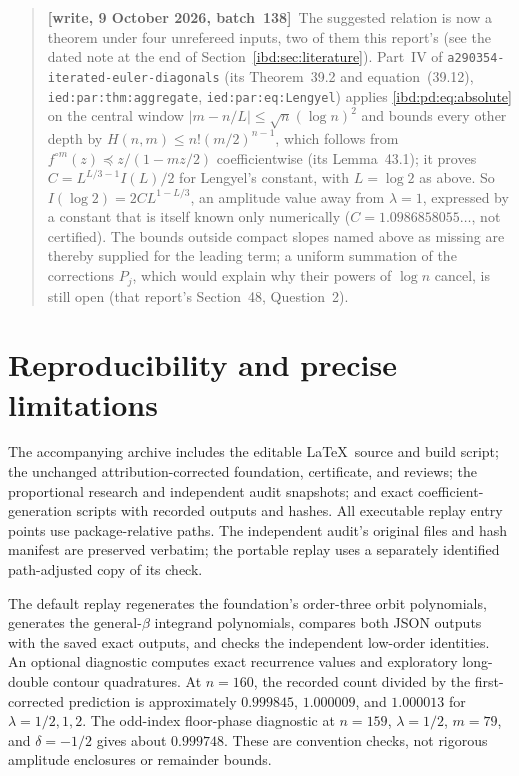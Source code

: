 \documentclass[11pt,letterpaper]{article}
\theoremstyle{remark}\newtheorem{remark}[theorem]{Remark}
\newcommand{\repopath}[1]{\nolinkurl{#1}}
\begin{document}
\par\smallskip\begin{quote}\small\textbf{[write, 9 October 2026, batch~138]}\ The suggested relation is now a theorem under four unrefereed inputs, two of them this report's (see the dated note at the end of Section~\ref{ibd:sec:literature}). Part~IV of \repopath{a290354-iterated-euler-diagonals} (its Theorem~39.2 and equation~(39.12), \texttt{ied:par:thm:aggregate}, \texttt{ied:par:eq:Lengyel}) applies \eqref{ibd:pd:eq:absolute} on the central window $|m-n/L|\le\sqrt n(\log n)^2$ and bounds every other depth by $H(n,m)\le n!(m/2)^{n-1}$, which follows from $f^{\circ m}(z)\preceq z/(1-mz/2)$ coefficientwise (its Lemma~43.1); it proves $C=L^{L/3-1}I(L)/2$ for Lengyel's constant, with $L=\log2$ as above. So $I(\log2)=2CL^{1-L/3}$, an amplitude value away from $\lambda=1$, expressed by a constant that is itself known only numerically ($C=1.0986858055\ldots$, not certified). The bounds outside compact slopes named above as missing are thereby supplied for the leading term; a uniform summation of the corrections $P_j$, which would explain why their powers of $\log n$ cancel, is still open (that report's Section~48, Question~2).\end{quote}\smallskip

\section{Reproducibility and precise limitations}\label{ibd:pd:sec:repro}
The accompanying archive includes the editable \LaTeX\ source and build script; the unchanged attribution-corrected foundation, certificate, and reviews; the proportional research and independent audit snapshots; and exact coefficient-generation scripts with recorded outputs and hashes. All executable replay entry points use package-relative paths. The independent audit's original files and hash manifest are preserved verbatim; the portable replay uses a separately identified path-adjusted copy of its check.

The default replay regenerates the foundation's order-three orbit polynomials, generates the general-$\beta$ integrand polynomials, compares both JSON outputs with the saved exact outputs, and checks the independent low-order identities. An optional diagnostic computes exact recurrence values and exploratory long-double contour quadratures. At $n=160$, the recorded count divided by the first-corrected prediction is approximately $0.999845$, $1.000009$, and $1.000013$ for $\lambda=1/2,1,2$. The odd-index floor-phase diagnostic at $n=159$, $\lambda=1/2$, $m=79$, and $\delta=-1/2$ gives about $0.999748$. These are convention checks, not rigorous amplitude enclosures or remainder bounds.
\end{document}
